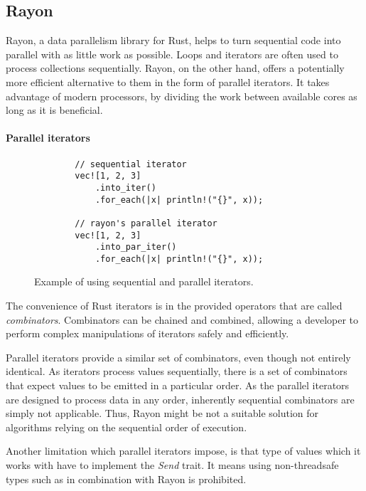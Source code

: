 \subsection{Rayon}
Rayon, a data parallelism library for Rust, helps to turn sequential code into parallel with as little work as possible. Loops and iterators are often used to process collections sequentially. Rayon, on the other hand, offers a potentially more efficient alternative to them in the form of parallel iterators. It takes advantage of modern processors, by dividing the work between available cores as long as it is beneficial.

\paragraph*{Parallel iterators}
\begin{figure}[!htbp]
    \centering

    \begin{verbatim}
        // sequential iterator
        vec![1, 2, 3]
            .into_iter()
            .for_each(|x| println!("{}", x));

        // rayon's parallel iterator
        vec![1, 2, 3]
            .into_par_iter()
            .for_each(|x| println!("{}", x));
    \end{verbatim}

    \caption{Example of using sequential and parallel iterators.}
    \label{fig:par-iter-example}
\end{figure}

The convenience of Rust iterators is in the provided operators that are called \emph{combinators}. Combinators can be chained and combined, allowing a developer to perform complex manipulations of iterators safely and efficiently.

Parallel iterators provide a similar set of combinators, even though not entirely identical. As iterators process values sequentially, there is a set of combinators that expect values to be emitted in a particular order. As the parallel iterators are designed to process data in any order, inherently sequential combinators are simply not applicable. Thus, Rayon might be not a suitable solution for algorithms relying on the sequential order of execution.

Another limitation which parallel iterators impose, is that type of values which it works with have to implement the \emph{Send} trait. It means using non-threadsafe types such as \rc{} in combination with Rayon is prohibited.

